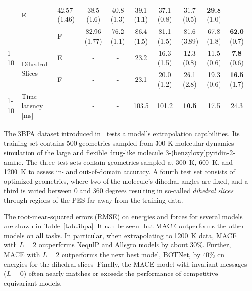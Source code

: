 \documentclass{article}
\begin{document}
\begin{table}[b]
{\begin{threeparttable}
\begin{tabular}{lll|cc|ccccc}
         & E                                &  42.57 (1.46) & 38.5 (1.6) &  40.8 (1.3)      &       39.1 (1.1)    & 37.1 (0.8)       & 31.7 (0.5)          & \textbf{29.8} (1.0)                       \\
         &                                  & F           &   82.96  (1.77)  & 76.2 (1.1) &   86.4 (1.5)    &     81.1 (1.5)       & 81.6 (3.89)         & 67.8 (1.8)          & \textbf{62.0} (0.7) \\
        \cmidrule{1-10}
         & \multirow{2}{*}{Dihedral Slices}
         & E                                & -  & - &   23.2             &           16.3  (1.5)    & 12.3 (0.8)       & 11.5 (0.6)          & \textbf{7.8} (0.6)                        \\
         &                                  & F           &  -     & -  &  23.1              &       20.0 (1.2)          & 26.1 (2.8)          & 19.3 (0.6)          & \textbf{16.5} (1.7) \\
        \cmidrule{1-10}
         & Time latency [ms]        &         &  -           & -            &  103.5& 101.2            & \textbf{10.5}       & 17.5                & 24.3                \\
        \bottomrule
      \end{tabular}
    \end{threeparttable}
  }
\end{table}

The 3BPA dataset introduced in~\cite{kovacs2021} tests a model's extrapolation capabilities.
Its training set contains 500 geometries sampled from 300 K molecular dynamics simulation of the large and flexible drug-like molecule 3-(benzyloxy)pyridin-2-amine.
The three test sets contain geometries sampled at 300~K, 600~K, and 1200~K to assess in- and out-of-domain accuracy.
A fourth test set consists of optimized geometries, where two of the molecule's dihedral angles are fixed,
and a third is varied between 0 and 360 degrees resulting in so-called \textit{dihedral slices} through regions of the PES far away from the training data.

The root-mean-squared errors (RMSE) on energies and forces for several models are shown in Table~\ref{tab:3bpa}.
It can be seen that MACE outperforms the other models on all tasks.
In particular, when extrapolating to 1200~K data, MACE with $L=2$ outperforms NequIP and Allegro models by about $30\%$.
Further, MACE with $L=2$ outperforms the next best model, BOTNet, by $40\%$ on energies for the dihedral slices.
Finally, the MACE model with invariant messages ($L=0$) often nearly matches or exceeds the performance of competitive equivariant models.
\end{document}
